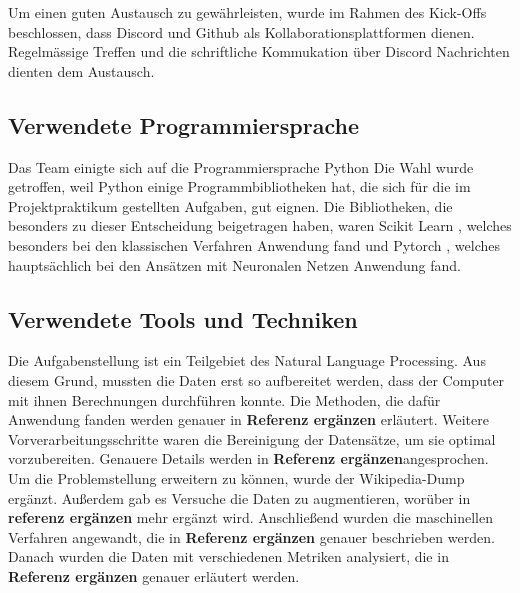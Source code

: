 Um einen guten Austausch zu gewährleisten, wurde im Rahmen des Kick-Offs beschlossen, dass Discord
und Github
als Kollaborationsplattformen dienen. Regelmässige Treffen und die schriftliche Kommukation über Discord Nachrichten dienten dem Austausch. %


\subsection{Verwendete Programmiersprache}
\label{Programmiersprache}
Das Team einigte sich auf die Programmiersprache Python
Die Wahl wurde getroffen, weil Python einige Programmbibliotheken hat, die sich für die im Projektpraktikum gestellten Aufgaben, gut eignen. Die Bibliotheken, die besonders zu dieser Entscheidung beigetragen haben, waren Scikit Learn \cite{Pedregosa2011}, welches besonders bei den klassischen Verfahren Anwendung fand und Pytorch \cite{Ansel2024}, welches hauptsächlich bei den Ansätzen mit Neuronalen Netzen Anwendung fand.

\subsection{Verwendete Tools und Techniken}
\label{ToolsUndTechniken}
Die Aufgabenstellung ist ein Teilgebiet des Natural Language Processing. Aus diesem Grund, mussten die Daten erst so aufbereitet werden, dass der Computer mit ihnen Berechnungen durchführen konnte. Die Methoden, die dafür Anwendung fanden werden genauer in \textbf{Referenz ergänzen} erläutert. Weitere Vorverarbeitungsschritte waren die Bereinigung der Datensätze, um sie optimal vorzubereiten. Genauere Details werden in \textbf{Referenz ergänzen}angesprochen. Um die Problemstellung erweitern zu können, wurde der Wikipedia-Dump ergänzt. Außerdem gab es Versuche die Daten zu augmentieren, worüber in \textbf{referenz ergänzen} mehr ergänzt wird. Anschließend wurden die maschinellen Verfahren angewandt, die in \textbf{Referenz ergänzen} genauer beschrieben werden. Danach wurden die Daten mit verschiedenen Metriken analysiert, die in \textbf{Referenz ergänzen} genauer erläutert werden.